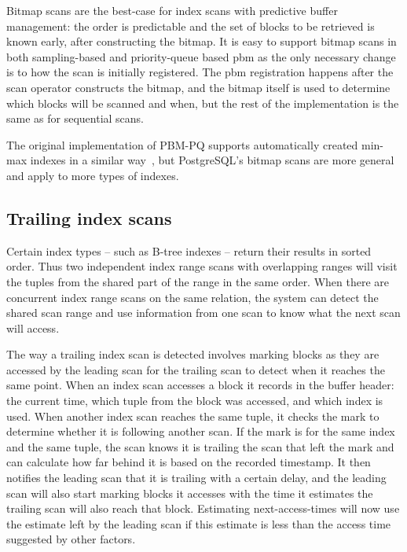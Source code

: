 Bitmap scans are the best-case for index scans with predictive buffer management: the order is predictable and the set of blocks to be retrieved is known early, after constructing the bitmap. It is easy to support bitmap scans in both sampling-based and priority-queue based \gls{pbm} as the only necessary change is to how the scan is initially registered. The \gls{pbm} registration happens after the scan operator constructs the bitmap, and the bitmap itself is used to determine which blocks will be scanned and when, but the rest of the implementation is the same as for sequential scans.

The original implementation of PBM-PQ supports automatically created min-max indexes in a similar way~\cite{pbm}, but PostgreSQL's bitmap scans are more general and apply to more types of indexes.


\subsection{Trailing index scans}
\label{sec:idx_trailing}

Certain index types -- such as B-tree indexes -- return their results in sorted order. Thus two independent index range scans with overlapping ranges will visit the tuples from the shared part of the range in the same order. When there are concurrent index range scans on the same relation, the system can detect the shared scan range and use information from one scan to know what the next scan will access.

The way a trailing index scan is detected involves marking blocks as they are accessed by the leading scan for the trailing scan to detect when it reaches the same point. When an index scan accesses a block it records in the buffer header: the current time, which tuple from the block was accessed, and which index is used. When another index scan reaches the same tuple, it checks the mark to determine whether it is following another scan. If the mark is for the same index and the same tuple, the scan knows it is trailing the scan that left the mark and can calculate how far behind it is based on the recorded timestamp. It then notifies the leading scan that it is trailing with a certain delay, and the leading scan will also start marking blocks it accesses with the time it estimates the trailing scan will also reach that block. Estimating next-access-times will now use the estimate left by the leading scan if this estimate is less than the access time suggested by other factors.

